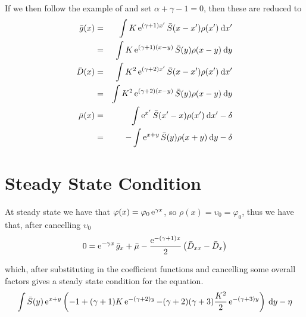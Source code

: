 \documentclass[../main.tex]{subfiles}
\begin{document}
  If we then follow the example of \cite{datta2011} and set $\alpha + \gamma - 1 = 0$, then these are reduced to
  \begin{eqnarray}
    \bar{g}(x)
    &=& \int K \operatorname{e}^{(\gamma + 1) x'} \bar{S}( x - x' ) \rho(x') \: \mathrm{d} x' \nonumber \\
    &=& \int K \operatorname{e}^{(\gamma + 1)(x-y)} \bar{S}(y) \rho(x-y) \: \mathrm{d}y \\
    \bar{D}(x)
    &=& \int K^2 \operatorname{e}^{(\gamma + 2) x'} \bar{S}( x - x' ) \rho(x') \: \mathrm{d} x' \nonumber \\
    &=& \int K^2 \operatorname{e}^{(\gamma + 2)(x-y)} \bar{S}(y) \rho(x-y) \: \mathrm{d}y \\
    \bar{\mu}(x)
    &=& \int \operatorname{e}^{x'} \bar{S}(x' - x)\rho(x') \: \mathrm{d}x' - \delta \nonumber \\
    &=& - \int \operatorname{e}^{x+y} \bar{S}(y) \rho(x+y) \: \mathrm{d}y - \delta
  \end{eqnarray}

  \section{Steady State Condition}
  At steady state we have that $\varphi(x) = \varphi_0 \operatorname{e}^{\gamma x}$, so $\rho(x) = \upsilon_0 = \varphi_0$, thus we have that, after cancelling $\upsilon_0$
  \begin{equation}
    0 =  \operatorname{e}^{-\gamma x}\bar{g}_x + \bar{\mu} - \frac{\operatorname{e}^{-(\gamma + 1) x}}{2} \left( \bar{D}_{xx} - \bar{D}_x \right)
  \end{equation}

  which, after substituting in the coefficient functions and cancelling some overall factors gives a steady state condition for the equation.
  \begin{equation}
    \int \bar{S}(y) \operatorname{e}^{x+y} \left( -1 + (\gamma +1)K\operatorname{e}^{-(\gamma + 2)y} - (\gamma +2 )(\gamma +3) \frac{K^2}{2}\operatorname{e}^{-(\gamma + 3)y} \right) \: \mathrm{d}y - \eta
  \end{equation}
\end{document}
